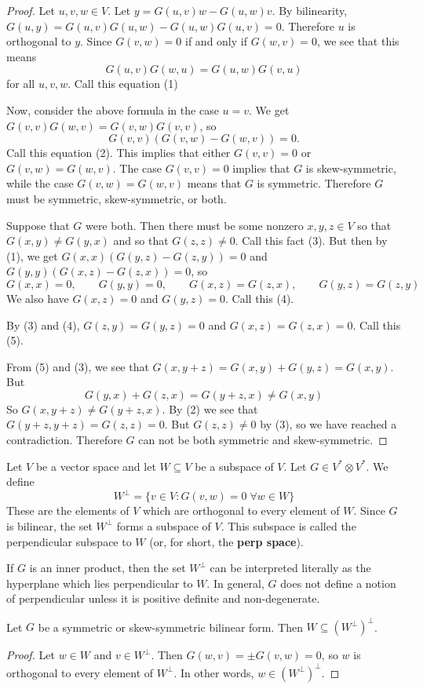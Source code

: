\begin{proof}
    Let $u,v,w\in V$. Let $y=G(u,v)w-G(u,w)v$. By bilinearity, $G(u,y)=G(u,v)G(u,w)-G(u,w)G(u,v)=0$. Therefore $u$ is orthogonal to $y$. Since $G(v,w)=0$ if and only if $G(w,v)=0$, we see that this means \[G(u,v)G(w,u)=G(u,w)G(v,u)\]  for all $u,v,w$. Call this equation (1)

    Now, consider the above formula in the case $u=v$. We get $G(v,v)G(w,v)=G(v,w)G(v,v)$, so \[G(v,v)(G(v,w)-G(w,v))=0.\] Call this equation (2). This implies that either $G(v,v)=0$ or $G(v,w)=G(w,v)$. The case $G(v,v)=0$ implies that $G$ is skew-symmetric, while the case $G(v,w)=G(w,v)$ means that $G$ is symmetric. Therefore $G$ must be symmetric, skew-symmetric, or both. 

    Suppose that $G$ were both. Then there must be some nonzero $x,y,z\in V$ so that $G(x,y)\neq G(y,x)$ and so that $G(z,z)\neq 0$. Call this fact (3). But then by (1), we get $G(x,x)(G(y,z)-G(z,y))=0$ and $G(y,y)(G(x,z)-G(z,x))=0$, so 
    \[G(x,x)=0,\qquad G(y,y)=0,\qquad G(x,z)=G(z,x),\qquad G(y,z)=G(z,y)\]
    We also have $G(x,z)=0$ and $G(y,z)=0$. Call this (4).

    
    By (3) and (4), $G(z,y)=G(y,z)=0$ and $G(x,z)=G(z,x)=0$. Call this (5). 
    
    From (5) and (3), we see that $G(x,y+z)=G(x,y)+G(y,z)=G(x,y)$. But \[G(y,x)+G(z,x)=G(y+z,x)\neq G(x,y)\]
    So $G(x,y+z)\neq G(y+z,x)$. By (2) we see that $G(y+z,y+z)=G(z,z)=0$. But $G(z,z)\neq 0$ by (3), so we have reached a contradiction. Therefore $G$ can not be both symmetric and skew-symmetric.
\end{proof}

\begin{defn} Let $V$ be a vector space and let $W \subseteq V$ be a subspace of $V$. Let $G \in V^* \otimes V^*$. We define
\begin{equation}
    W^\perp = \{v \in V : G(v,w)=0\;\forall w\in W\}
\end{equation}
These are the elements of $V$ which are orthogonal to every element of $W$. Since $G$ is bilinear, the set $W^\perp$ forms a subspace of $V$. This subspace is called the perpendicular subspace to $W$ (or, for short, the \textbf{perp space}).
\end{defn}
\begin{example}
    If $G$ is an inner product, then the set $W^\perp$ can be interpreted literally as the hyperplane which lies perpendicular to $W$. In general, $G$ does not define a notion of perpendicular unless it is positive definite and non-degenerate.
\end{example}
\begin{lemma}
Let $G$ be a symmetric or skew-symmetric bilinear form. Then $W \subseteq (W^\perp)^\perp$.
\end{lemma}
\begin{proof}
    Let $w \in W$ and $v \in W^\perp$. Then $G(w,v) = \pm G(v,w) = 0$, so $w$ is orthogonal to every element of $W^\perp$. In other words, $w \in (W^\perp)^\perp$.
\end{proof}

